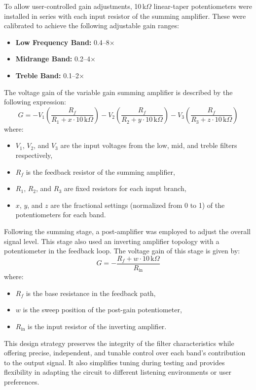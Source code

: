 \documentclass[12pt]{article}
\begin{document}
To allow user-controlled gain adjustments, 10\,k$\Omega$ linear-taper potentiometers were installed in series with each input resistor of the summing amplifier. These were calibrated to achieve the following adjustable gain ranges:
\begin{itemize}
	\item \textbf{Low Frequency Band:} 0.4–8×
	\item \textbf{Midrange Band:} 0.2–4×
	\item \textbf{Treble Band:} 0.1–2×
\end{itemize}
The voltage gain of the variable gain summing amplifier is described by the following expression:
\[
	G = -V_1\left(\frac{R_f}{R_1 + x \cdot 10\,\text{k}\Omega}\right)
	-V_2\left(\frac{R_f}{R_2 + y \cdot 10\,\text{k}\Omega}\right)
	-V_3\left(\frac{R_f}{R_3 + z \cdot 10\,\text{k}\Omega}\right)
\]
where:
\begin{itemize}
	\item $V_1$, $V_2$, and $V_3$ are the input voltages from the low, mid, and treble filters respectively,
	\item $R_f$ is the feedback resistor of the summing amplifier,
	\item $R_1$, $R_2$, and $R_3$ are fixed resistors for each input branch,
	\item $x$, $y$, and $z$ are the fractional settings (normalized from 0 to 1) of the potentiometers for each band.
\end{itemize}

Following the summing stage, a post-amplifier was employed to adjust the overall signal level. This stage also used an inverting amplifier topology with a potentiometer in the feedback loop. The voltage gain of this stage is given by:
\[
	G = -\frac{R_f + w \cdot 10\,\text{k}\Omega}{R_{\text{in}}}
\]
where:
\begin{itemize}
	\item $R_f$ is the base resistance in the feedback path,
	\item $w$ is the sweep position of the post-gain potentiometer,
	\item $R_{\text{in}}$ is the input resistor of the inverting amplifier.
\end{itemize}

This design strategy preserves the integrity of the filter characteristics while offering precise, independent, and tunable control over each band's contribution to the output signal. It also simplifies tuning during testing and provides flexibility in adapting the circuit to different listening environments or user preferences.
\end{document}
